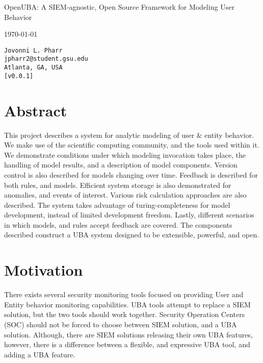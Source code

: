 \documentclass[10pt, titlepage, twocolumn]{article}
\date{\today}
\date{}
\begin{document}
\begin{titlepage}

\protect\parbox{.9\textwidth}
	{\protect\centering 
		\huge OpenUBA: A SIEM-agnostic, Open Source Framework for Modeling User Behavior

	}
\begin{center}
{\LARGE
\today}
\end{center}

 
 \vfill
{
\Large
\begin{center}
\texttt{Jovonni L. Pharr} \\
\texttt{jpharr2@student.gsu.edu} \\
\texttt{Atlanta, GA, USA} \\
\texttt{[v0.0.1]} \\
\end{center}
}



\vfill
\section*{Abstract}
\noindent
This project describes a system for analytic modeling of user \& entity behavior. We make use of the scientific computing community, and the tools used within it. We demonstrate conditions under which modeling invocation takes place, the handling of model results, and a description of model components. Version control is also described for models changing over time. Feedback is described for both rules, and models. Efficient system storage is also demonstrated for anomalies, and events of interest. Various risk calculation approaches are also described. The system takes advantage of turing-completeness for model development, instead of limited development freedom. Lastly, different scenarios in which models, and rules accept feedback are covered. The components described construct a UBA system designed to be extensible, powerful, and open.
\end{titlepage}



\section{Motivation}
There exists several security monitoring tools focused on providing User and Entity behavior monitoring capabilities. UBA tools attempt to replace a SIEM solution, but the two tools should work together. Security Operation Centers (SOC) should not be forced to choose between SIEM solution, and a UBA solution. Although, there are SIEM solutions releasing their own UBA features, however, there is a difference between a flexible, and expressive UBA tool, and adding a UBA feature. 
\end{document}
